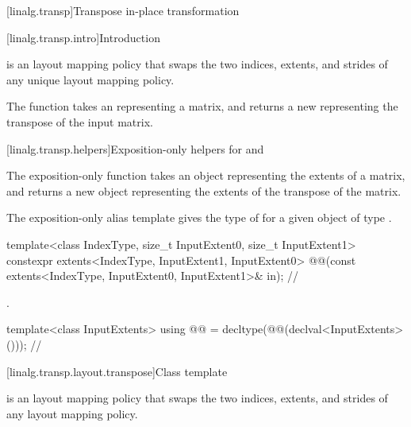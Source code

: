 [linalg.transp]{Transpose in-place transformation}

[linalg.transp.intro]{Introduction}

\pnum
{} is an  layout mapping policy
that swaps the two indices, extents, and strides
of any unique  layout mapping policy.

\pnum
The  function takes an 
representing a matrix, and returns a new 
representing the transpose of the input matrix.

[linalg.transp.helpers]{Exposition-only helpers for  and }

\pnum
The exposition-only  function
takes an  object representing the extents of a matrix,
and returns a new  object
representing the extents of the transpose of the matrix.

\pnum
The exposition-only alias template
gives the type of 
for a given  object  of type .
\begin{itemdecl}
template<class IndexType, size_t InputExtent0, size_t InputExtent1>
  constexpr extents<IndexType, InputExtent1, InputExtent0>
    @@(const extents<IndexType, InputExtent0, InputExtent1>& in);   // \expos
\end{itemdecl}

\begin{itemdescr}
\pnum
\returns
{}.
\end{itemdescr}

\begin{codeblock}
template<class InputExtents>
  using @@ =
    decltype(@@(declval<InputExtents>()));        // \expos
\end{codeblock}

[linalg.transp.layout.transpose]{Class template }

\pnum
{} is an  layout mapping policy
that swaps the two indices, extents, and strides
of any  layout mapping policy.

